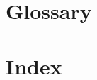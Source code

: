 \documentclass{aurak-sdp}
\begin{document}
\cleardoublepage
\setcounter{chapter}{6}
\chapter{Glossary}
\begin{chapterpage}
\end{chapterpage}\pagestyle{gl}


\cleardoublepage
\setcounter{chapter}{8}
\chapter{Index}
\begin{chapterpage}
\end{chapterpage}
\printindex
\end{document}
